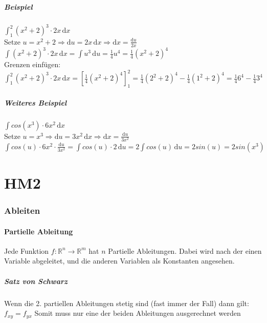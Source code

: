 \documentclass[a4paper,portrait]{scrartcl}
\begin{document}
\subsubsection*{Beispiel}
$ \int_{1}^{2} \!(x^2+2)^3 \cdot 2x \,\mathrm{d}x $ \\
Setze $ u = x^2 + 2 \Rightarrow \mathrm{d}u = 2x \,\mathrm{d}x \Rightarrow \mathrm{d}x = \frac{\mathrm{d}u}{2x}$ \\
$ \int \!(x^2+2)^3 \cdot 2x \,\mathrm{d}x = \int \! u^3 \,\mathrm{d}u = \frac{1}{4}u^4 = \frac{1}{4}(x^2+2)^4$ \\
Grenzen einfügen: $ \int_{1}^{2} \!(x^2+2)^3 \cdot 2x \,\mathrm{d}x = \left[ \frac{1}{4}(x^2+2)^4 \right]_1^2 = \frac{1}{4}(2^2+2)^4 - \frac{1}{4}(1^2+2)^4 = \frac{1}{4}6^4 - \frac{1}{4}3^4$
\subsubsection*{Weiteres Beispiel}
$ \int \!cos(x^3) \cdot 6x^2 \,\mathrm{d}x $ \\
Setze $ u = x^3 \Rightarrow \mathrm{d}u = 3x^2 \,\mathrm{d}x \Rightarrow \mathrm{d}x = \frac{\mathrm{d}u}{3x^2}$ \\
$ \int \!cos(u) \cdot 6x^2 \cdot \frac{\mathrm{d}u}{3x^2} = \int \!cos(u) \cdot 2 \,\mathrm{d}u = 2 \int \!cos(u) \,\mathrm{d}u = 2 sin(u) = 2 sin(x^3)$



\clearpage
\part*{HM2}
\section{Ableiten}
\subsection{Partielle Ableitung}
Jede Funktion $f: \mathbb{R}^n \rightarrow \mathbb{R}^m$ hat $n$ Partielle Ableitungen.
Dabei wird nach der einen Variable abgeleitet, und die anderen Variablen als Konstanten angesehen.
\subsubsection{Satz von Schwarz}
Wenn die 2. partiellen Ableitungen stetig sind (fast immer der Fall) dann gilt: \\
$ f_{xy} = f_{yx} $ Somit muss nur eine der beiden Ableitungen ausgerechnet werden
\end{document}
